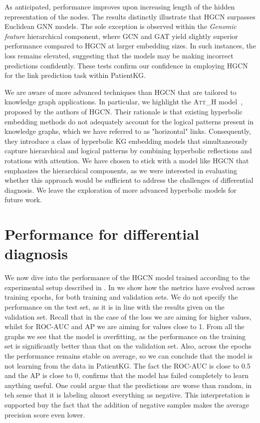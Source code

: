 As anticipated, performance improves upon increasing length of the hidden representation of the nodes. The results distinctly illustrate that HGCN surpasses Euclidean GNN models. The sole exception is observed within the \emph{Genomic feature} hierarchical component, where GCN and GAT yield slightly superior performance compared to HGCN at larger embedding sizes. In such instances, the loss remains elevated, suggesting that the models may be making incorrect predictions confidently. These tests confirm our confidence in employing HGCN for the link prediction task within PatientKG.


We are aware of more advanced techniques than HGCN that are tailored to knowledge graph applications. In particular, we highlight the \textsc{Att\_H} model~\cite{chami2020lowDimensionalHyperbolicKnowledgeGraphEmbeddings}, proposed by the authors of HGCN. Their rationale is that existing hyperbolic embedding methods do not adequately account for the logical patterns present in knowledge graphs, which we have referred to as "horizontal" links. Consequently, they introduce a class of hyperbolic KG embedding models that simultaneously capture hierarchical and logical patterns by combining hyperbolic reflections and rotations with attention. We have chosen to stick with a model like HGCN that emphasizes the hierarchical components, as we were interested in evaluating whether this approach would be sufficient to address the challenges of differential diagnosis. We leave the exploration of more advanced hyperbolic models for future work.



\section{Performance for differential diagnosis}
We now dive into the performance of the HGCN model trained according to the experimental setup described in . In  we show how the metrics have evolved across training epochs, for both training and validation sets. We do not specify the performance on the test set, as it is in line with the results given on the validation set. Recall that in the case of the loss we are aiming for higher values, whilst for ROC-AUC and AP we are aiming for values close to 1. From all the graphs we see that the model is overfitting, as the performance on the training set is significantly better than that on the validation set. Also, across the epochs the performance remains stable on average, so we can conclude that the model is not learning from the data in PatientKG. The fact the ROC-AUC is close to 0.5 and the AP is close to 0, confirms that the model has failed completely to learn anything useful. One could argue that the predictions are worse than random, in teh sense that it is labeling almost everything as negative. This interpretation is supported buy the fact that the addition of negative samples makes the average precision score even lower. 

